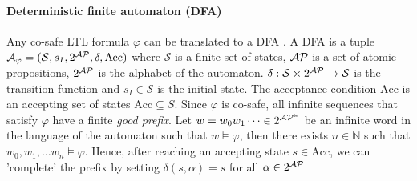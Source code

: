 \paragraph*{Deterministic finite automaton (DFA)} Any co-safe LTL formula $\varphi$ can be translated to a DFA \cite{keylist}. A DFA is a tuple $\mathcal{A}_{\varphi} = (\mathcal{S},s_I,2^{\mathcal{AP}}, \delta,\textrm{Acc})$ where $\mathcal{S}$ is a finite set of states, $\mathcal{AP}$ is a set of atomic propositions, $2^{\mathcal{AP}}$ is the alphabet of the automaton. $\delta: \mathcal{S} \times 2^{\mathcal{AP}} \rightarrow \mathcal{S} $ is the transition function and $s_I \in \mathcal{S}$ is the initial state. The acceptance condition $\textrm{Acc}$ is an accepting set of states $\textrm{Acc} \subseteq S$. Since $\varphi$ is co-safe, all infinite sequences that satisfy $\varphi$ have a finite \emph{good prefix}. Let $w = w_0 w_1 \dots \in 2^{{\mathcal{AP}}^{\omega}}$ be an infinite word in the language of the automaton such that $w \vDash \varphi$, then there exists $n\in \mathbb{N}$ such that $w_0,w_1,\dots w_n \vDash \varphi$. Hence, after reaching an accepting state $s \in \textrm{Acc}$, we can 'complete' the prefix by setting $\delta(s,\alpha) = s$ for all $\alpha \in 2^{\mathcal{AP}}$




